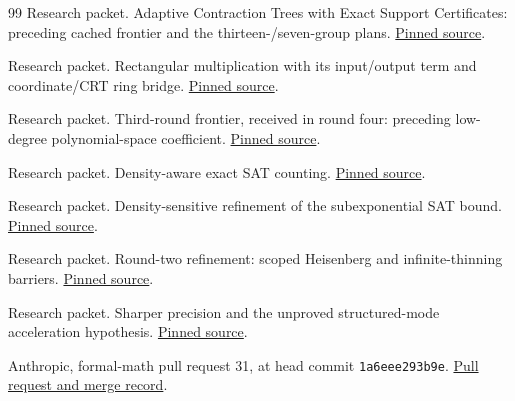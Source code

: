 \begin{thebibliography}{99}
 Research packet. Adaptive Contraction Trees with Exact Support Certificates: preceding cached frontier and the thirteen-/seven-group plans. \href{https://github.com/VladimirReshetnikov/ProveIt/blob/a7ae5ab55f9627f5af7bf77443b3c34ef8ef1be4/Computability/SubexponentialSAT/Research/sat_adaptive_tree_certificate/report.tex}{Pinned source}.

 Research packet. Rectangular multiplication with its input/output term and coordinate/CRT ring bridge. \href{https://github.com/VladimirReshetnikov/ProveIt/blob/a7ae5ab55f9627f5af7bf77443b3c34ef8ef1be4/Computability/SubexponentialSAT/Research/subsat_rectangular/sections/rectangular.tex}{Pinned source}.

 Research packet. Third-round frontier, received in round four: preceding low-degree polynomial-space coefficient. \href{https://github.com/VladimirReshetnikov/ProveIt/blob/a7ae5ab55f9627f5af7bf77443b3c34ef8ef1be4/Computability/SubexponentialSAT/Research/3sat_round3_frontier/report/frontier.tex}{Pinned source}.

 Research packet. Density-aware exact SAT counting. \href{https://github.com/VladimirReshetnikov/ProveIt/blob/a7ae5ab55f9627f5af7bf77443b3c34ef8ef1be4/Computability/SubexponentialSAT/Research/sat_density_improvement/density_aware_sat_improvement.tex}{Pinned source}.

 Research packet. Density-sensitive refinement of the subexponential SAT bound. \href{https://github.com/VladimirReshetnikov/ProveIt/blob/a7ae5ab55f9627f5af7bf77443b3c34ef8ef1be4/Computability/SubexponentialSAT/Research/eth_density_refinement/report.tex}{Pinned source}.

 Research packet. Round-two refinement: scoped Heisenberg and infinite-thinning barriers. \href{https://github.com/VladimirReshetnikov/ProveIt/blob/a7ae5ab55f9627f5af7bf77443b3c34ef8ef1be4/Computability/SubexponentialSAT/Research/3sat_round2_refinement/report/report.tex}{Pinned source}.

 Research packet. Sharper precision and the unproved structured-mode acceleration hypothesis. \href{https://github.com/VladimirReshetnikov/ProveIt/blob/a7ae5ab55f9627f5af7bf77443b3c34ef8ef1be4/Computability/SubexponentialSAT/Research/3sat_precision_refinement/report.tex}{Pinned source}.

 Anthropic, formal-math pull request 31, at head commit \texttt{1a6eee293b9e}. \href{https://github.com/anthropics/formal-math/pull/31}{Pull request and merge record}.


\end{thebibliography}
